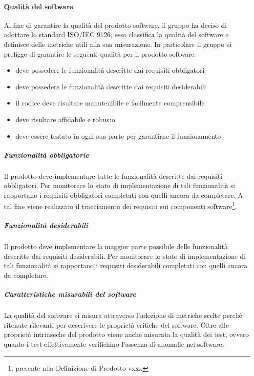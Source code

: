 \paragraph{Qualità del software}

Al fine di garantire la qualità del prodotto software, il gruppo ha deciso di adottare lo standard
ISO/IEC 9126, esso classifica la qualità del software e definisce delle metriche utili alla sua
misurazione. In particolare il gruppo si prefigge di garantire le seguenti qualità per il prodotto
software:
\begin{itemize}
\item deve possedere le funzionalità descritte dai requisiti obbligatori
\item deve possedere le funzionalità descritte dai requisiti desiderabili
\item il codice deve risultare manutenibile e facilmente comprensibile
\item deve risultare affidabile e robusto
\item deve essere testato in ogni sua parte per garantirne il
  funzionamento
\end{itemize}
\subparagraph{Funzionalità obbligatorie}
Il prodotto deve implementare tutte le funzionalità descritte dai
requisiti obbligatori. Per monitorare lo stato di implementazione di
tali funzionalità si rapportano i requisiti obbligatori
completati con quelli ancora da completare. A tal fine viene
realizzato il tracciamento dei requisiti sui componenti
software\footnote{presente nlla Definizione di
  Prodotto vxxx}.
\subparagraph{Funzionalità desiderabili}
Il prodotto deve implementare la maggior parte possibile delle
funzionalità descritte dai requisiti desiderabili. Per monitorare lo
stato di implementazione di tali funzionalità si rapportano i
requisiti desiderabili
completati con quelli ancora da completare.
\subparagraph{Caratteristiche misurabili del software}
La qualità del software si misura attraverso l'adozione di metriche
scelte perchè ritenute rilevanti per descrivere le proprietà
critiche del software.
Oltre alle proprietà intrinseche del prodotto viene anche misurata la
qualità dei test, ovvero quanto i test effettivamente verifichino
l'assenza di anomalie nel software.




